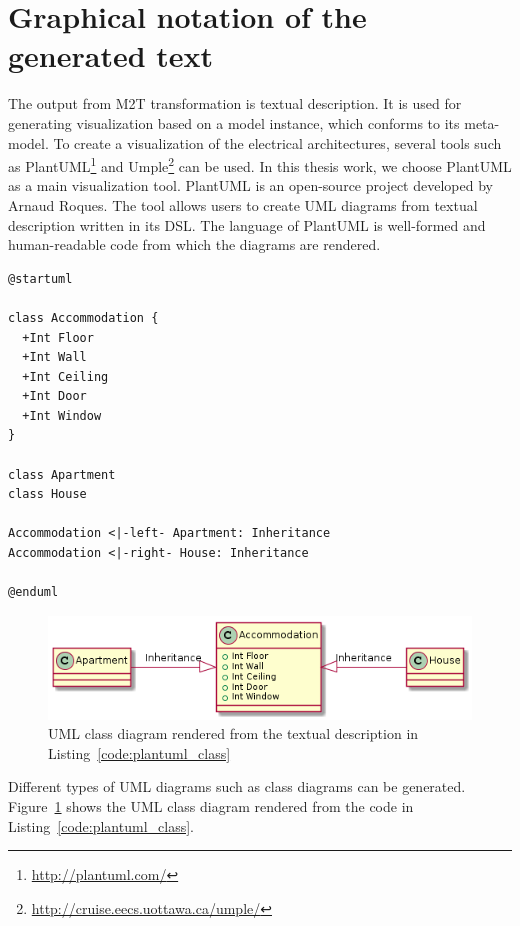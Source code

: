 \section{Graphical notation of the generated text}
The output from M2T transformation is textual description. It is used for generating visualization based on a model instance, which conforms to its meta-model. To create a visualization of the electrical architectures, several tools such as PlantUML\footnote{\url{http://plantuml.com/}} and Umple\footnote{\url{http://cruise.eecs.uottawa.ca/umple/}} can be used. In this thesis work, we choose PlantUML as a main visualization tool. PlantUML is an open-source project developed by Arnaud Roques. The tool allows users to create UML diagrams from textual description written in its DSL. The language of PlantUML is well-formed and human-readable code from which the diagrams are rendered.

\begin{lstlisting}[caption=An example of textual description of a class diagram, label=code:plantuml_class]
@startuml

class Accommodation {
  +Int Floor
  +Int Wall
  +Int Ceiling
  +Int Door
  +Int Window
}

class Apartment
class House

Accommodation <|-left- Apartment: Inheritance
Accommodation <|-right- House: Inheritance

@enduml
\end{lstlisting}

\begin{figure}[H]
\centering
\captionsetup{justification=centering}
\vspace{0cm}%
\includegraphics[width=0.8\linewidth]{figure/misc/plantuml_class.png}
\caption{UML class diagram rendered from the textual description in Listing~\ref{code:plantuml_class}}
\label{fig:plantuml_class}
\end{figure}

Different types of UML diagrams such as class diagrams can be generated. Figure~\ref{fig:plantuml_class} shows the UML class diagram rendered from the code in Listing~\ref{code:plantuml_class}.\\

